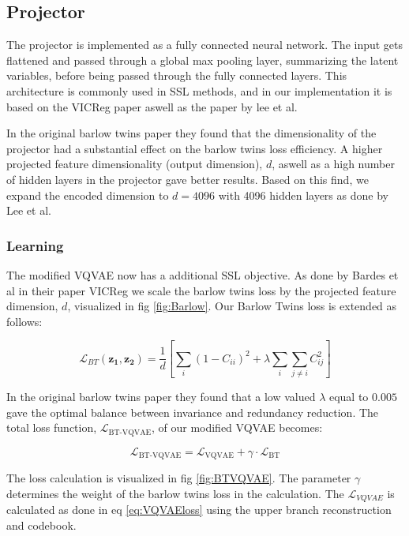 \subsection{Projector}
The projector is implemented as a fully connected neural network. The input gets flattened and passed through a global max pooling layer, summarizing the latent variables, before being passed through the fully connected layers.
This architecture is commonly used in SSL methods, and in our implementation it is based on the VICReg paper\cite{VICReg} aswell as the paper by lee et al\cite{SSLs}.

In the original barlow twins paper \cite{Barlow} they found that the dimensionality of the projector had a substantial effect on the barlow twins loss efficiency. A higher projected feature dimensionality (output dimension), $d$, aswell as a high number of hidden layers in the projector
gave better results. Based on this find, we expand the encoded dimension to $d=4096$ with 4096 hidden layers as done by Lee et al\cite{SSLs}.

\subsubsection{Learning}
The modified VQVAE now has a additional SSL objective. As done by Bardes et al in their paper VICReg\cite{VICReg} we scale the barlow twins loss by the projected feature dimension, $d$, visualized in fig \ref{fig:Barlow}. Our Barlow Twins loss is extended as follows:

\begin{equation}
\mathcal{L}_{BT}(\mathbf{z_1}, \mathbf{z_2}) =\frac{1}{d} \left[ \sum_i (1 - C_{ii})^2 + \lambda \sum_i \sum_{j \neq i} C_{ij}^2\right]
\end{equation}

In the original barlow twins paper\cite{Barlow} they found that a low valued $\lambda$ equal to $0.005$ gave the optimal balance between invariance and redundancy reduction. 
The total loss function, $\mathcal{L}_{\text{BT-VQVAE}}$, of our modified VQVAE becomes:

\begin{equation}
    \mathcal{L}_{\text{BT-VQVAE}} = \mathcal{L}_{\text{VQVAE}} + \gamma \cdot \mathcal{L}_\text{BT}
    \label{eq:BTVQVAEloss}
\end{equation}

The loss calculation is visualized in fig \ref{fig:BTVQVAE}. The parameter $\gamma$ determines the weight of the barlow twins loss in the calculation. The $\mathcal{L}_{VQVAE}$ is calculated as done in eq \ref{eq:VQVAEloss} using the upper branch reconstruction and codebook.


